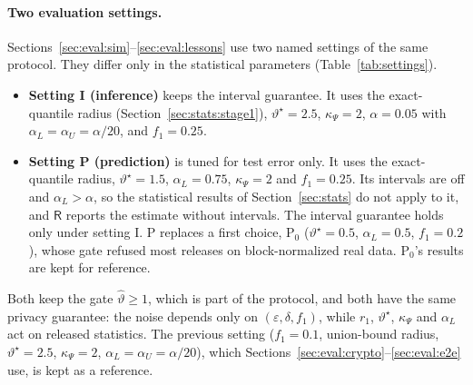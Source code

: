 \documentclass[11pt]{article}
\theoremstyle{definition}
\theoremstyle{plain}
\newcommand{\Party}[1]{\textsf{#1}}
\newcommand{\Rp}{\Party{R}}
\begin{document}
\paragraph{Two evaluation settings.} Sections~\ref{sec:eval:sim}--\ref{sec:eval:lessons} use two named settings of the same protocol. They differ only in the statistical parameters (Table~\ref{tab:settings}).
\begin{itemize}[noitemsep]
  \item \textbf{Setting I (inference)} keeps the interval guarantee. It uses the exact-quantile radius (Section~\ref{sec:stats:stage1}), $\vartheta^\star = 2.5$, $\kappa_\Psi = 2$, $\alpha = 0.05$ with $\alpha_L = \alpha_U = \alpha/20$, and $f_1 = 0.25$.
  \item \textbf{Setting P (prediction)} is tuned for test error only. It uses the exact-quantile radius, $\vartheta^\star = 1.5$, $\alpha_L = 0.75$, $\kappa_\Psi = 2$ and $f_1 = 0.25$. Its intervals are off and $\alpha_L > \alpha$, so the statistical results of Section~\ref{sec:stats} do not apply to it, and $\Rp$ reports the estimate without intervals. The interval guarantee holds only under setting I. P replaces a first choice, P$_0$ ($\vartheta^\star = 0.5$, $\alpha_L = 0.5$, $f_1 = 0.2$), whose gate refused most releases on block-normalized real data. P$_0$'s results are kept for reference.
\end{itemize}
Both keep the gate $\hat\vartheta \ge 1$, which is part of the protocol, and both have the same privacy guarantee: the noise depends only on $(\varepsilon, \delta, f_1)$, while $r_1$, $\vartheta^\star$, $\kappa_\Psi$ and $\alpha_L$ act on released statistics. The previous setting ($f_1 = 0.1$, union-bound radius, $\vartheta^\star = 2.5$, $\kappa_\Psi = 2$, $\alpha_L = \alpha_U = \alpha/20$), which Sections~\ref{sec:eval:crypto}--\ref{sec:eval:e2e} use, is kept as a reference.
\end{document}
